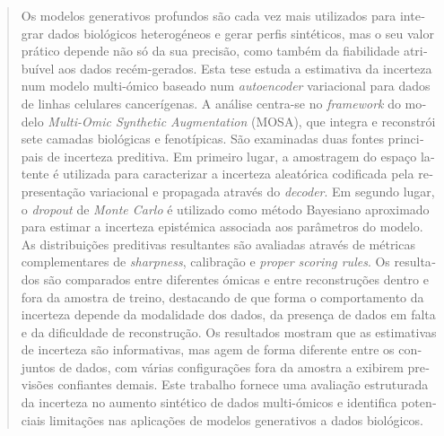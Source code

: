 
\begin{otherlanguage}{portuguese}
\begin{abstract}
\abstractPortuguesePageNumber
Os modelos generativos profundos são cada vez mais utilizados para integrar dados biológicos heterogéneos e gerar perfis sintéticos, mas o seu valor prático depende não só da sua precisão, como também da fiabilidade atribuível aos dados recém-gerados. Esta tese estuda a estimativa da incerteza num modelo multi-ómico baseado num \textit{autoencoder} variacional para dados de linhas celulares cancerígenas. A análise centra-se no \textit{framework} do modelo \textit{Multi-Omic Synthetic Augmentation} (MOSA), que integra e reconstrói sete camadas biológicas e fenotípicas. São examinadas duas fontes principais de incerteza preditiva. Em primeiro lugar, a amostragem do espaço latente é utilizada para caracterizar a incerteza aleatórica codificada pela representação variacional e propagada através do \textit{decoder}. Em segundo lugar, o \textit{dropout} de \textit{Monte Carlo} é utilizado como método Bayesiano aproximado para estimar a incerteza epistémica associada aos parâmetros do modelo. As distribuições preditivas resultantes são avaliadas através de métricas complementares de \textit{sharpness}, calibração e \textit{proper scoring rules}. Os resultados são comparados entre diferentes ómicas e entre reconstruções dentro e fora da amostra de treino, destacando de que forma o comportamento da incerteza depende da modalidade dos dados, da presença de dados em falta e da dificuldade de reconstrução. Os resultados mostram que as estimativas de incerteza são informativas, mas agem de forma diferente entre os conjuntos de dados, com várias configurações fora da amostra a exibirem previsões confiantes demais. Este trabalho fornece uma avaliação estruturada da incerteza no aumento sintético de dados multi-ómicos e identifica potenciais limitações nas aplicações de modelos generativos a dados biológicos.

\begin{flushleft}



\end{flushleft}

\end{abstract}
\end{otherlanguage}